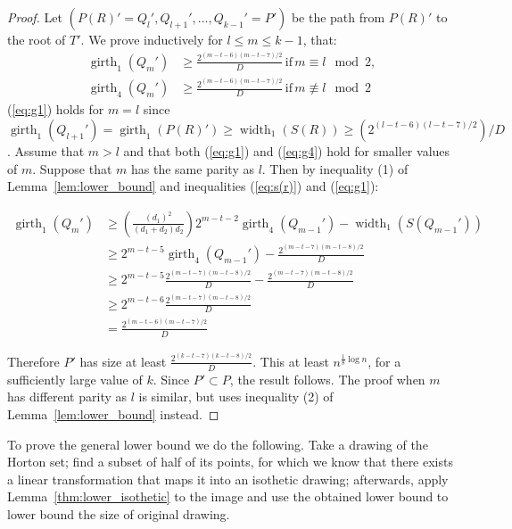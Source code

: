 \documentclass{article}
\begin{document}
\begin{proof}
Let $(P(R)'=Q_l', Q_{l+1}',\dots, Q_{k-1}'=P')$ be the path from $P(R)'$
to the root of $T'$. We prove inductively for $l \le m \le k-1$, that:
\begin{align}
  \operatorname{girth}_{1}(Q_m') & \ge \frac{2^{(m-t-6)(m-t-7)/2}}{D} \, \mbox{if} \, m \equiv l \mod 2, \label{eq:g1}\\ 
  \operatorname{girth}_{4}(Q_m') & \ge \frac{2^{(m-t-6)(m-t-7)/2}}{D} \, \mbox{if} \, m \not \equiv l \mod 2 \label{eq:g4}
\end{align}
(\ref{eq:g1}) holds for $m=l$ since 
$\operatorname{girth}_1(Q_{l+1}')= \operatorname{girth}_1(P(R)')\ge \operatorname{width}_1 (S(R)) \ge(2^{(l-t-6)(l-t-7)/2})/D$.
Assume that $m>l$ and that both (\ref{eq:g1}) and (\ref{eq:g4}) hold for smaller values of $m$.
Suppose that $m$ has the same parity as $l$.
Then by inequality (1) of Lemma~\ref{lem:lower_bound} and inequalities (\ref{eq:s(r)}) and (\ref{eq:g1}):

\begin{align*}
 \operatorname{girth}_{1}(Q_m') &\ge  \left( \frac{(d_1)^2}{(d_1+d_2)d_2} \right ) 2^{m-t-2} 
 \operatorname{girth}_4(Q_{m-1}')-\operatorname{width}_1(S(Q_{m-1}'))\\
&\ge 2^{m-t-5} \operatorname{girth}_4(Q_{m-1}')-\frac{2^{(m-t-7)(m-t-8)/2}}{D}\\
&\ge 2^{m-t-5}\frac{2^{(m-t-7)(m-t-8)/2}}{D}-\frac{2^{(m-t-7)(m-t-8)/2}}{D}\\
&\ge 2^{m-t-6}\frac{2^{(m-t-7)(m-t-8)/2}}{D} \\
&=\frac{2^{(m-t-6)(m-t-7)/2}}{D}
\end{align*}

Therefore $P'$ has size at least $\frac{2^{(k-t-7)(k-t-8)/2}}{D}$. This at least
$n^{\frac{1}{8}\log n}$, for a sufficiently large value of $k$. Since $P' \subset P$,
the result follows.
The proof when $m$ has different parity as $l$ is similar, but uses inequality (2) of  Lemma~\ref{lem:lower_bound}
instead.
\end{proof}


To prove the general lower bound we do the following. Take a drawing of the Horton set;
find a subset of half of its points, for which we know that there exists
a linear transformation that maps it into an isothetic drawing; afterwards, apply
Lemma~\ref{thm:lower_isothetic} to the image and use the obtained lower bound to lower bound
the size of original drawing.
\end{document}

